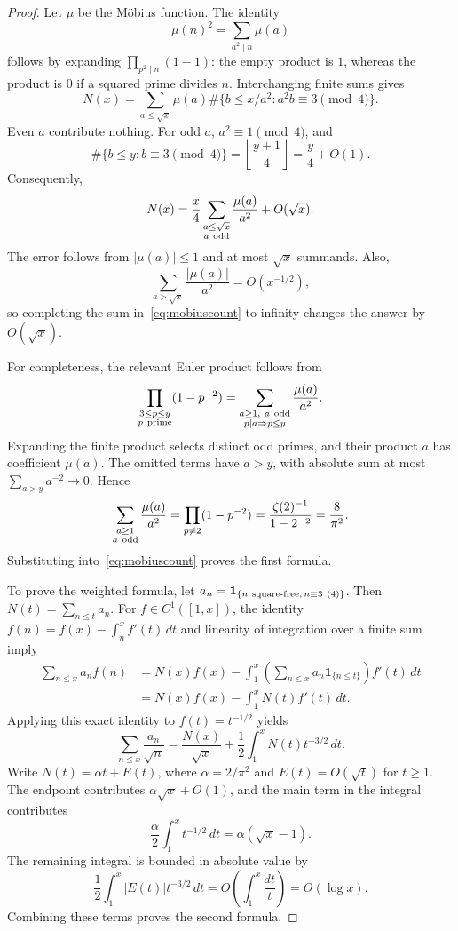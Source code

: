 \documentclass[a4paper,11pt]{article}
\theoremstyle{remark}
\begin{document}
\begin{proof}
Let $\mu$ be the M\"obius function. The identity
\[
 \mu(n)^2=\sum_{a^2\mid n}\mu(a)
\]
follows by expanding $\prod_{p^2\mid n}(1-1)$: the empty product is $1$,
whereas the product is $0$ if a squared prime divides $n$.
Interchanging finite sums gives
\[
 N(x)=
 \sum_{a\le\sqrt x}\mu(a)
 \#\{b\le x/a^2:a^2b\equiv3\pmod4\}.
\]
Even $a$ contribute nothing. For odd $a$, $a^2\equiv1\pmod4$, and
\[
 \#\{b\le y:b\equiv3\pmod4\}
 =\left\lfloor\frac{y+1}{4}\right\rfloor
 =\frac y4+O(1).
\]
Consequently,
\begin{equation}\label{eq:mobiuscount}
 N(x)=\frac x4\sum_{\substack{a\le\sqrt x\\a\ {\rm odd}}}
                      \frac{\mu(a)}{a^2}+O(\sqrt x).
\end{equation}
The error follows from $|\mu(a)|\le1$ and at most $\sqrt x$ summands.
Also,
\[
 \sum_{a>\sqrt x}\frac{|\mu(a)|}{a^2}=O(x^{-1/2}),
\]
so completing the sum in~\eqref{eq:mobiuscount} to infinity changes the
answer by $O(\sqrt x)$.

For completeness, the relevant Euler product follows from
\[
 \prod_{\substack{3\le p\le y\\p\ {\rm prime}}}(1-p^{-2})
 =
 \sum_{\substack{a\ge1,\ a\ {\rm odd}\\p\mid a\Rightarrow p\le y}}
 \frac{\mu(a)}{a^2}.
\]
Expanding the finite product selects distinct odd primes, and their
product $a$ has coefficient $\mu(a)$. The omitted terms have $a>y$,
with absolute sum at most $\sum_{a>y}a^{-2}\to0$. Hence
\[
 \sum_{\substack{a\ge1\\a\ {\rm odd}}}\frac{\mu(a)}{a^2}
 =\prod_{p\ne2}(1-p^{-2})
 =\frac{\zeta(2)^{-1}}{1-2^{-2}}
 =\frac8{\pi^2}.
\]
Substituting into~\eqref{eq:mobiuscount} proves the first formula.

To prove the weighted formula, let
$a_n=\mathbf1_{\{n\ {\rm square\text{-}free},\,n\equiv3\ (4)\}}$.
Then $N(t)=\sum_{n\le t}a_n$. For $f\in C^1([1,x])$, the identity
$f(n)=f(x)-\int_n^x f'(t)\,dt$ and linearity of integration over
a finite sum imply
\begin{align*}
 \sum_{n\le x}a_nf(n)
 &=N(x)f(x)
   -\int_1^x\left(\sum_{n\le x}a_n\mathbf1_{\{n\le t\}}\right)
     f'(t)\,dt\\
 &=N(x)f(x)-\int_1^x N(t)f'(t)\,dt.
\end{align*}
Applying this exact identity to $f(t)=t^{-1/2}$ yields
\[
 \sum_{n\le x}\frac{a_n}{\sqrt n}
 =\frac{N(x)}{\sqrt x}
  +\frac12\int_1^x N(t)t^{-3/2}\,dt.
\]
Write $N(t)=\alpha t+E(t)$, where
$\alpha=2/\pi^2$ and $E(t)=O(\sqrt t)$ for $t\ge1$.
The endpoint contributes $\alpha\sqrt x+O(1)$, and the main term in
the integral contributes
\[
 \frac{\alpha}{2}\int_1^x t^{-1/2}\,dt
 =\alpha(\sqrt x-1).
\]
The remaining integral is bounded in absolute value by
\[
 \frac12\int_1^x |E(t)|t^{-3/2}\,dt
 =O\!\left(\int_1^x\frac{dt}{t}\right)=O(\log x).
\]
Combining these terms proves the second formula.
\end{proof}
\end{document}
